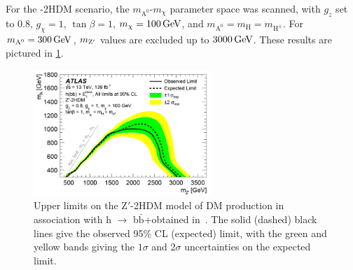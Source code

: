 For the \Zp-2HDM scenario, the $m_{\mathrm{A}^0}$-$m_\chi$ parameter space was scanned, with $g_z$ set to 0.8, $g_\chi=1$, $\tan\beta=1$, $m_\chi = \GeV{100}$, and $m_{\mathrm{A}^0}=m_\mathrm{H}=m_{\mathrm{H}^\pm}$. For $m_{\mathrm{A}^0} = \GeV{300}$, $m_{\mathrm{Z}'}$ values are excluded up to $\GeV{3000}$. These results are pictured in \cref{fig:hbbmet20212}.

\begin{figure}[ht]
\centering
\includegraphics[width=0.6\textwidth]{Chapters/Experiment/2021hbbmet_results2.png}
\caption{Upper limits on the Z$'$-2HDM model of DM production in association with h $\to$ b$\bar{\mathrm{b}}$+\ptmiss obtained in~\cite{atlas:hbb2021}. The solid (dashed) black lines give the observed 95\% CL (expected) limit, with the green and yellow bands giving the $1\sigma$ and $2\sigma$ uncertainties on the expected limit.}
\label{fig:hbbmet20212}
\end{figure}